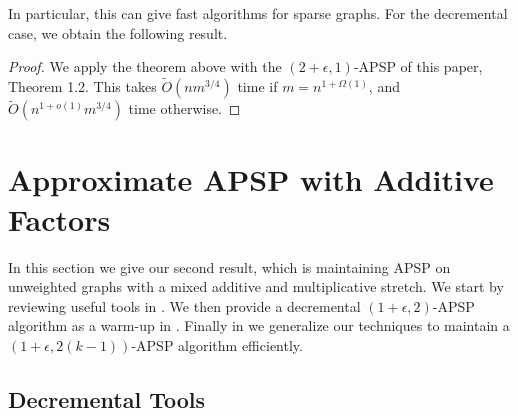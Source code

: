 \documentclass[11pt]{article}
\newtheorem{corollary}[theorem]{Corollary}
\theoremstyle{definition}
\theoremstyle{remark}
\newcommand{\ttodo}[1]{\todo[color=orange!20]{T: #1}}
\begin{document}
\begin{titlepage}
In particular, this can give fast algorithms for sparse graphs.
For the decremental case, we obtain the following result. 
\thmtwoUnw*
\begin{proof}
    We apply the theorem above with the $(2+\epsilon,1)$-APSP of this paper, Theorem 1.2. This takes $\tilde O( nm^{3/4})$ time if $m=n^{1+\Omega(1)}$, and $\tilde O( n^{1+o(1)}m^{3/4})$ time otherwise.
\end{proof}



\newpage
\section{Approximate APSP with Additive Factors}\label{sc:additive}
In this section we give our second result, which is maintaining APSP on unweighted graphs with a mixed additive and multiplicative stretch. We start by reviewing useful tools in .  We then provide a decremental $(1+\epsilon, 2)$-APSP algorithm as a warm-up in . Finally in  we generalize our techniques to maintain a $(1+\epsilon, 2(k-1))$-APSP algorithm efficiently.


\subsection{Decremental Tools}  \label{sec:additive_tools}


\end{titlepage}
\end{document}
